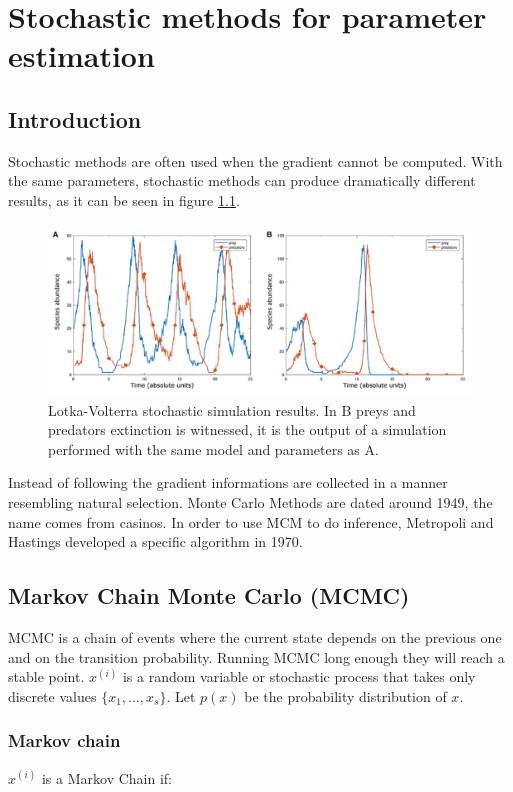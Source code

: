 \graphicspath{{chapters/11/images}}
\chapter{Stochastic methods for parameter estimation}

\section{Introduction}
Stochastic methods are often used when the gradient cannot be computed.
With the same parameters, stochastic methods can produce dramatically different results, as it can be seen in figure \ref{fig:res}.

\begin{figure}[H]
  \centering
  \includegraphics[width=\textwidth]{stoch_LV.png}
  \caption{Lotka-Volterra stochastic simulation results. In B
  preys and predators extinction is witnessed, it is the output of a simulation
  performed with the same model and parameters as A.}
\label{fig:res}
\end{figure}

Instead of following the gradient informations are collected in a manner resembling natural selection.
Monte Carlo Methods are dated around 1949, the name comes from casinos.
In order to use MCM to do inference, Metropoli and Hastings developed a specific algorithm in 1970.

\section{Markov Chain Monte Carlo (MCMC)}
MCMC is a chain of events where the current state depends on the previous one and on the transition probability.
Running MCMC long enough they will reach a stable point.
$x^{(i)}$ is a random variable or stochastic process that takes only discrete values $\{x_1,\dots,x_s\}$.
Let $p(x)$ be the probability distribution of $x$.

  \subsection{Markov chain}
  $x^{(i)}$ is a Markov Chain if:


